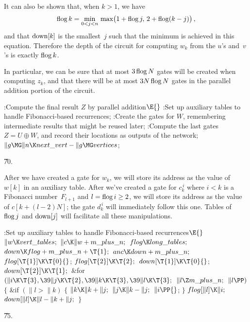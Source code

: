 It can also be shown that, when $k>1$, we have
$$\mathop{\rm flog}\nolimits k=\min_{0<j<n}\,\max\bigl(1+\mathop{\rm flog}\nolimits j,\,2+\mathop{\rm flog}\nolimits(k-j)\bigr)\,,$$
and that $\mathop{\rm down}[k]$ is the smallest~$j$ such that the minimum is
achieved in this equation. Therefore the depth of the circuit for
computing $w_k$ from the $u$'s and~$v$'s is exactly $\mathop{\rm flog}\nolimits k$.

In particular, we can be sure that at most $3\mathop{\rm flog}\nolimits N$ gates will be
created when computing $z_k$, and that there will be at most $3N\mathop{\rm flog}\nolimits N$
gates in the parallel addition portion of the circuit.

\Y\B\4:Compute the final result $Z$ by parallel addition\X${}\E{}$\6
:Set up auxiliary tables to handle Fibonacci-based recurrences\X;\6
:Create the gates for $W$, remembering intermediate results that might be
reused later\X;\6
:Compute the last gates $Z=U\oplus W$, and record their locations as
outputs of the network\X;\6
${}\|g\MG\|n\K\\{next\_vert}-\|g\MG\\{vertices}{}$;\par
\U70.\fi

After we have created a gate for $w_k$, we will store its address as
the value of $w[k]$ in an auxiliary table. After we've created a gate
for $c_k^{\,i}$ where $i<k$ is a Fibonacci number~$F_{l+1}$ and
$l=\mathop{\rm flog}\nolimits i\ge2$, we will store its address as the value of
$c[k+(l-2)N]$; the gate $d_k^{\,i}$ will immediately follow this one.
Tables of $\mathop{\rm flog}\nolimits j$ and $\mathop{\rm down}[j]$ will facilitate all these
manipulations.

\Y\B\4:Set up auxiliary tables to handle Fibonacci-based recurrences\X${}%
\E{}$\6
$\|w\K\\{vert\_tables};{}$\6
${}\|c\K\|w+\\{m\_plus\_n};{}$\6
${}\\{flog}\K\\{long\_tables};{}$\6
${}\\{down}\K\\{flog}+\\{m\_plus\_n}+\T{1};{}$\6
${}\\{anc}\K\\{down}+\\{m\_plus\_n};{}$\6
${}\\{flog}[\T{1}]\K\T{0}{}$;\5
${}\\{flog}[\T{2}]\K\T{2};{}$\6
${}\\{down}[\T{1}]\K\T{0}{}$;\5
${}\\{down}[\T{2}]\K\T{1};{}$\6
\&{for} ${}(\|i\K\T{3},\39\|j\K\T{2},\39\|k\K\T{3},\39\|l\K\T{3};{}$ ${}\|l\Z%
\\{m\_plus\_n};{}$ ${}\|l\PP){}$\5
${}\{{}$\1\6
\&{if} ${}(\|l>\|k){}$\5
${}\{{}$\1\6
${}\|k\K\|k+\|j;{}$\6
${}\|j\K\|k-\|j;{}$\6
${}\|i\PP{}$;\6
\4${}\}{}$\2\6
${}\\{flog}[\|l]\K\|i;{}$\6
${}\\{down}[\|l]\K\|l-\|k+\|j;{}$\6
\4${}\}{}$\2\par
\U75.\fi

